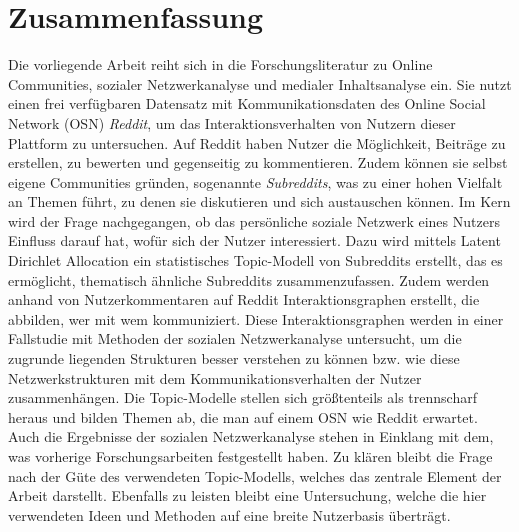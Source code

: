 \section*{Zusammenfassung}

Die vorliegende Arbeit reiht sich in die Forschungsliteratur zu Online Communities, sozialer Netzwerkanalyse und medialer Inhaltsanalyse ein.
Sie nutzt einen frei verfügbaren Datensatz mit Kommunikationsdaten des Online Social Network (OSN) \emph{Reddit}, um das Interaktionsverhalten von Nutzern dieser Plattform zu untersuchen.
Auf Reddit haben Nutzer die Möglichkeit, Beiträge zu erstellen, zu bewerten und gegenseitig zu kommentieren.
Zudem können sie selbst eigene Communities gründen, sogenannte \emph{Subreddits}, was zu einer hohen Vielfalt an Themen führt, zu denen sie diskutieren und sich austauschen können.
Im Kern wird der Frage nachgegangen, ob das persönliche soziale Netzwerk eines Nutzers Einfluss darauf hat, wofür sich der Nutzer interessiert.  
Dazu wird mittels Latent Dirichlet Allocation ein statistisches Topic-Modell von Subreddits erstellt, das es ermöglicht, thematisch ähnliche Subreddits zusammenzufassen.
Zudem werden anhand von Nutzerkommentaren auf Reddit Interaktionsgraphen erstellt, die abbilden, wer mit wem kommuniziert.
Diese Interaktionsgraphen werden in einer Fallstudie mit Methoden der sozialen Netzwerkanalyse untersucht, um die zugrunde liegenden Strukturen besser verstehen zu können bzw. wie diese Netzwerkstrukturen mit dem Kommunikationsverhalten der Nutzer zusammenhängen.
Die Topic-Modelle stellen sich größtenteils als trennscharf heraus und bilden Themen ab, die man auf einem OSN wie Reddit erwartet.
Auch die Ergebnisse der sozialen Netzwerkanalyse stehen in Einklang mit dem, was vorherige Forschungsarbeiten festgestellt haben.
Zu klären bleibt die Frage nach der Güte des verwendeten Topic-Modells, welches das zentrale Element der Arbeit darstellt.
Ebenfalls zu leisten bleibt eine Untersuchung, welche die hier verwendeten Ideen und Methoden auf eine breite Nutzerbasis überträgt.